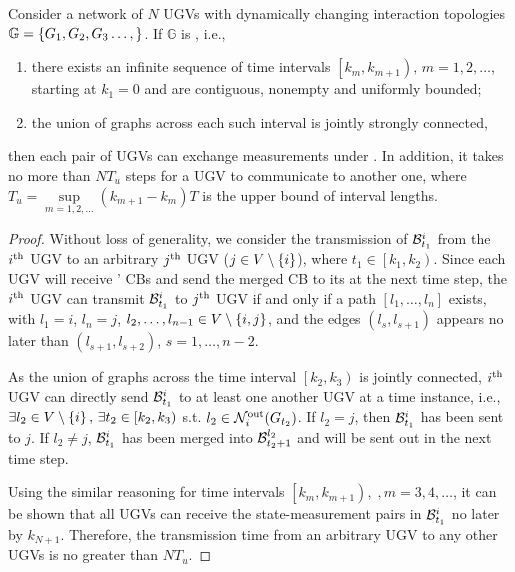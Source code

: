 	\begin{thm}\label{prop1}
		Consider a network of $N$ UGVs with dynamically changing interaction topologies \small$\mathbb{G}=\left\lbrace G_{1},G_{2},G_{3}\dots,\right\rbrace$\normalsize.
		If $\mathbb{G}$ is \fc, i.e.,
		\begin{enumerate}
			\item there exists an infinite sequence of time intervals $\left[k_m,k_{m+1} \right),\,m=1,2,\dots$, starting at $k_1=0$ and are contiguous, nonempty and uniformly bounded;
			\item the union of graphs across each such interval is jointly strongly connected,
		\end{enumerate}
		then each pair of UGVs can exchange measurements under \proto. 
		In addition, it takes no more than $NT_u$ steps for a UGV to communicate to another one, 
		where \small$T_u=\sup\limits_{m=1,2,\dots}\left( k_{m+1}-k_m\right) T$ \normalsize is the upper bound of interval lengths.
	\end{thm}
	
	\begin{proof}				
		Without loss of generality, we consider the transmission of $\mathcal{B}^i_{t_1}$ from the $i^\text{th}$ UGV to an arbitrary $j^\text{th}$ UGV ($j\in V\setminus \left\lbrace i\right\rbrace$), where $t_1\in\left[k_1,k_2 \right)$.
		Since each UGV will receive \inbhd' CBs and send the merged CB to its {\onbhd} at the next time step, the $i^\text{th}$ UGV can transmit $\mathcal{B}^i_{t_1}$ to $j^\text{th}$ UGV if and only if a path $\left[l_1,\dots,l_n\right]$ exists, with $l_1=i$, $l_n=j$, $l_2,\dots,l_{n-1}\in V\setminus\left\lbrace i,j\right\rbrace$, and the edges $(l_s,l_{s+1})$ appears no later than $(l_{s+1},l_{s+2})$, $s=1,\dots,n-2$.
		
		As the union of graphs across the time interval $\left[k_2,k_3 \right)$ is jointly connected, $i^\text{th}$ UGV can directly send $\mathcal{B}^i_{t_1}$ to at least one another UGV at a time instance, i.e., $\exists l_2\in V\setminus \left\lbrace i\right\rbrace,\, \exists t_2\in \left[k_2,k_3 \right)$ s.t. $l_2\in\mathcal{N}^\text{out}_{i}(G_{t_2})$.
		If $l_2=j$, then $\mathcal{B}^i_{t_1}$ has been sent to $j$.
		If $l_2\neq j$, $\mathcal{B}^i_{t_1}$ has been merged into $\mathcal{B}^{l_2}_{t_2+1}$ and will be sent out in the next time step. 
		
		Using the similar reasoning for time intervals $\left[k_m,k_{m+1} \right),\;,m=3,4,\dots$, it can be shown that all UGVs can receive the state-measurement pairs in $\mathcal{B}^i_{t_1}$ no later by $k_{N+1}$.
		Therefore, the transmission time from an arbitrary UGV to any other UGVs is no greater than \small$NT_u$\normalsize.
		
	\end{proof}

